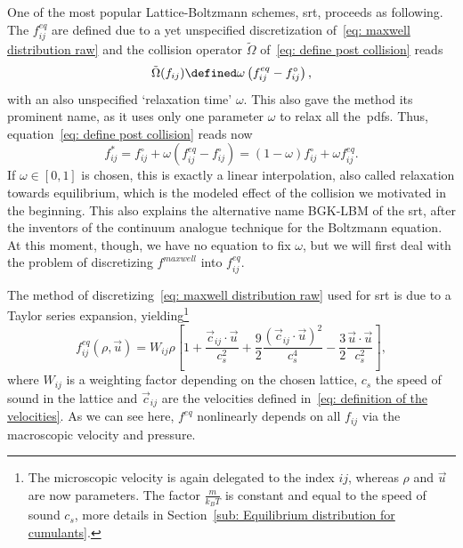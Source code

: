 One of the most popular Lattice-Boltzmann schemes, \gls{srt}, proceeds as following.
The $f_{ij}^{eq}$ are defined due to a yet unspecified discretization of~\eqref{eq: maxwell distribution raw} and the collision operator $\tilde{\Omega}$ of~\eqref{eq: define post collision} reads
\begin{equation*}
  \tilde{\Omega}(f_{ij}) \defined \omega \left(f_{ij}^{eq} - f_{ij}^{\circ}\right),
\end{equation*}
with an also unspecified `relaxation time' $\omega$.
This also gave the method its prominent name, as it uses only one parameter $\omega$ to relax all the~\glspl{pdf}.
Thus, equation~\eqref{eq: define post collision} reads now
\begin{equation}
  \label{eq: post collision discrete}
  f_{ij}^* = f_{ij}^{\circ} + \omega \left(f_{ij}^{eq} - f_{ij}^{\circ}\right) = (1-\omega)f_{ij}^{\circ} + \omega f_{ij}^{eq}.
\end{equation}
If $\omega\in[0,1]$ is chosen, this is exactly a linear interpolation, also called relaxation towards equilibrium, which is the modeled effect of the collision we motivated in the beginning.
This also explains the alternative name BGK-LBM of the \gls{srt}, after the inventors of the continuum analogue technique for the Boltzmann equation.
At this moment, though, we have no equation to fix $\omega$, but we will first deal with the problem of discretizing $f^{maxwell}$ into $f_{ij}^{eq}$.

The method of discretizing~\eqref{eq: maxwell distribution raw} used for \gls{srt} is due to a Taylor series expansion, yielding\footnote{The microscopic velocity is again delegated to the index $ij$, whereas $\rho$ and $\vec{u}$ are now parameters.
The factor $\frac{m}{k_B T}$ is constant and equal to the speed of sound $c_s$, more details in Section~\ref{sub: Equilibrium distribution for cumulants}.}
\begin{equation}
  \label{eq: equilibrium particle distributions}
  f_{ij}^{eq}(\rho,\vec{u}) = W_{ij}\rho
  \left[
    1
    + \frac{\vec{c}_{ij} \cdot \vec{u}}{c_s^2}
    + \frac{9}{2}\frac{{(\vec{c}_{ij} \cdot \vec{u})}^2}{c_s^4}
    - \frac{3}{2}\frac{\vec{u} \cdot \vec{u}}{c_s^2}
  \right],
\end{equation}
where $W_{ij}$ is a weighting factor depending on the chosen lattice, $c_s$ the speed of sound in the lattice and $\vec{c}_{ij}$ are the velocities defined in~\eqref{eq: definition of the velocities}.
As we can see here, $f^{eq}$ nonlinearly depends on all $f_{ij}$ via the macroscopic velocity and pressure.

